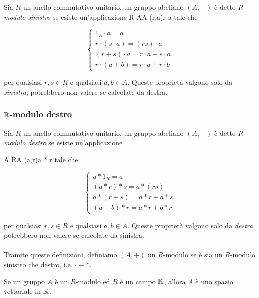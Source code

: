 Sia $ R $ un anello commutativo unitario, un gruppo abeliano $ (A,+) $ è detto $ R $\textit{-modulo sinistro} se esiste un'applicazione
%
\map{\cdot}
	{R \times A}{A}
	{(r,a)}{r \cdot a}
tale che

\begin{equation}
	\begin{cases}
		1_{R} \cdot a = a \\
		r \cdot (s \cdot a) = (r s) \cdot a \\
		(r+s) \cdot a = r \cdot a + s \cdot a \\
		r \cdot (a+b) = r \cdot a + r \cdot b
	\end{cases}
\end{equation}

per qualsiasi $ r, s \in R $ e qualsiasi $ a, b \in A $. Queste proprietà valgono solo da \textit{sinistra}, potrebbero non valere se calcolate da destra.

\subsubsection{$ \mathbb{R} $-modulo destro}

Sia $ R $ un anello commutativo unitario, un gruppo abeliano $ (A,+) $ è detto $ R $\textit{-modulo destro} se esiste un'applicazione

%
\map{*}
	{A \times R}{A}
	{(a,r)}{a * r}
tale che

\begin{equation}
	\begin{cases}
		a * 1_{R} = a \\
		(a*r)*s = a*(r s) \\
		a*(r+s) = a*r + a*s \\
		(a+b)*r = a*r + b*r
	\end{cases}
\end{equation}

per qualsiasi $ r,s \in R $ e qualsiasi $ a,b \in A $. Queste proprietà valgono solo da \textit{destra}, potrebbero non valere se calcolate da sinistra. \\ \\
%
Tramite queste definizioni, definiamo $ (A,+) $ un $ R $-modulo se è sia un $ R $-modulo sinistro che destro, i.e. $ \cdot \equiv * $.

\begin{remark}
	Se un gruppo $ A $ è un $ R $-modulo ed $ R $ è un campo $ \mathbb{K} $, allora $ A $ è uno spazio vettoriale in $ \mathbb{K} $.
\end{remark}

